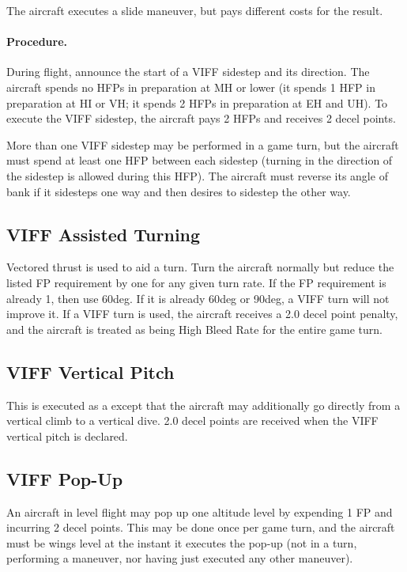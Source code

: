 \begin{advancedrules}
{The aircraft executes a slide maneuver, but pays different costs for the result.

\paragraph{Procedure.} During flight, announce the start of a VIFF sidestep and its direction. The aircraft spends no HFPs in preparation at MH or lower (it spends 1 HFP in preparation at HI or VH; it spends 2 HFPs in preparation at EH and UH). To execute the VIFF sidestep, the aircraft pays 2 HFPs and receives 2 decel points.

More than one VIFF sidestep may be performed in a game turn, but the aircraft must spend at least one HFP between each sidestep (turning in the direction of the sidestep is allowed during this HFP). The aircraft must reverse its angle of bank if it sidesteps one way and then desires to sidestep the other way.

\subsection{VIFF Assisted Turning}

Vectored thrust is used to aid a turn. Turn the aircraft normally but reduce the listed FP requirement by one for any given turn rate. If the FP requirement is already 1, then use 60{deg}. If it is already 60{deg} or 90{deg}, a VIFF turn will not improve it. If a VIFF turn is used, the aircraft receives a 2.0 decel point penalty, and the aircraft is treated as being High Bleed Rate for the entire game turn.

\subsection{VIFF Vertical Pitch}

This is executed as a  except that the aircraft may additionally go directly from a vertical climb to a vertical dive. 2.0 decel points are received when the VIFF vertical pitch is declared. 

\subsection{VIFF Pop-Up}

An aircraft in level flight may pop up one altitude level by expending 1 FP and incurring 2 decel points. This may be done once per game turn, and the aircraft must be wings level at the instant it executes the pop-up (not in a turn, performing a maneuver, nor having just executed any other maneuver).

}
\end{advancedrules}
